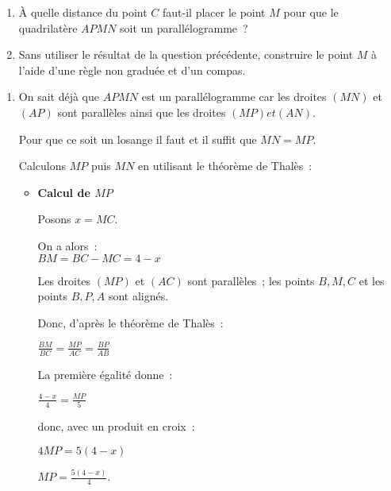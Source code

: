 \begin{enumerate}
     \item
     À quelle distance du point $ C $ faut-il placer le point $ M $ pour que le quadrilatère $ APMN $ soit un parallélogramme~?
     \item
     Sans utiliser le résultat de la question précédente, construire le point $ M$ à l'aide d'une règle non graduée et d'un compas.
\end{enumerate}
\begin{corrige}
     \begin{enumerate}
          \item
          On sait déjà que $ APMN $ est un parallélogramme car les droites $ \left( MN \right) $ et $ \left( AP \right) $ sont parallèles ainsi que les droites $ \left( MP \right) et \left( AN \right).$
          \par
          Pour que ce soit un losange il faut et il suffit que $ MN = MP. $
          \par
          Calculons $ MP $ puis $ MN $ en utilisant le théorème de Thalès~:
          \begin{itemize}
               \item
               \textbf{Calcul de $ MP$ }
               \par
               Posons $ x = MC. $
               \par
               On a alors~:
               \\
               $ BM = BC - MC = 4 - x $
               \par
               Les droites $ \left( MP \right) $ et $ \left( AC \right) $ sont parallèles~; les points $ B, M, C $ et les points $ B, P, A $ sont alignés.
               \par
               Donc, d'après le théorème de Thalès~:
               \begin{center}
                    $ \frac{ BM }{ BC } = \frac{ MP }{ AC } = \frac{ BP }{ AB } $
               \end{center}
               La première égalité donne~:
               \par
               $ \frac{ 4-x }{ 4 } = \frac{ MP }{ 5 } $
               \par
               donc, avec un produit en croix~:
               \par
               $ 4 MP = 5 \left( 4-x \right) $
               \par
               $ MP = \frac{ 5 \left( 4-x \right) }{ 4 }. $

\end{itemize}
\end{enumerate}
\end{corrige}
